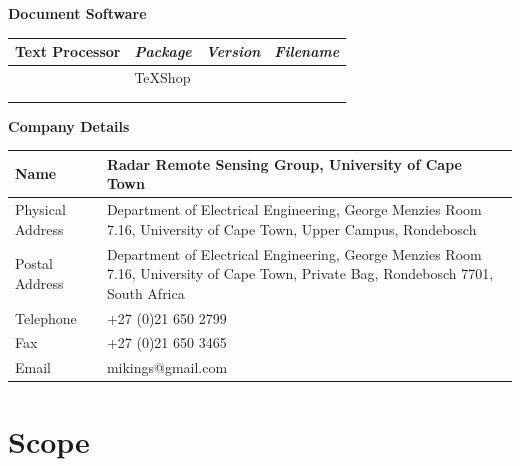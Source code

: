 \documentclass[english, 12pt]{report}
\providecommand{\tabularnewline}{\\}
\def\docname{\jobname}
\begin{document}
\begin{table}[H]
\begin{centering}
\textbf{\large Document Software}
\par\end{centering}{\large \par}

\centering{}%
\begin{tabular}{|m{35mm}|>{\centering}m{35mm}|>{\centering}m{20mm}|>{\centering}m{62mm}|}
\hline 
 Text Processor& \centering{}\emph{Package} & \centering{}\emph{Version} & \centering{}\emph{Filename}\tabularnewline
\hline 
\hline 
& TeXShop & 3.5 & \docname \tabularnewline
\hline 
 &  &  & \tabularnewline
\hline 
 &  &  & \tabularnewline
\hline 
\end{tabular}
\end{table}


\begin{table}[H]
\begin{centering}
\textbf{\large Company Details}
\par\end{centering}{\large \par}

\centering{}%
\begin{tabular}{|m{30mm}|m{130mm}|}
\hline 
Name & Radar Remote Sensing Group, University of Cape Town\tabularnewline
\hline 
Physical Address & Department of Electrical Engineering, George Menzies Room 7.16, University
of Cape Town, Upper Campus, Rondebosch \tabularnewline
\hline 
Postal Address & Department of Electrical Engineering, George Menzies Room 7.16, University
of Cape Town, Private Bag, Rondebosch 7701, South Africa\tabularnewline
\hline 
Telephone & +27 (0)21 650 2799\tabularnewline
\hline 
Fax & +27 (0)21 650 3465\tabularnewline
\hline 
Email & mikings@gmail.com\tabularnewline
\hline 
\end{tabular}
\end{table}


\newpage

\tableofcontents{}

\newpage

\listoffigures


\newpage

\listoftables


\newpage

\listoftodos


\chapter{Scope}
\end{document}
